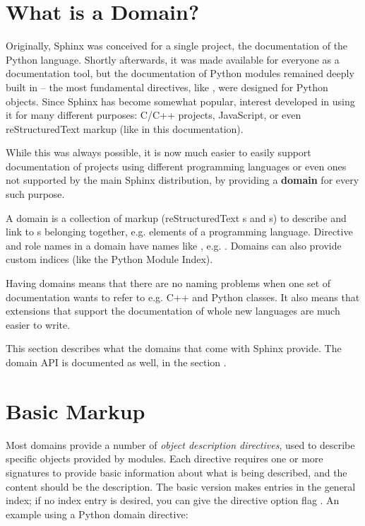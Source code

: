 \documentclass[letterpaper,10pt,english]{sphinxmanual}
\begin{document}
\section{What is a Domain?}
\label{domains:what-is-a-domain}
Originally, Sphinx was conceived for a single project, the documentation of the
Python language.  Shortly afterwards, it was made available for everyone as a
documentation tool, but the documentation of Python modules remained deeply
built in -- the most fundamental directives, like , were designed
for Python objects.  Since Sphinx has become somewhat popular, interest
developed in using it for many different purposes: C/C++ projects, JavaScript,
or even reStructuredText markup (like in this documentation).

While this was always possible, it is now much easier to easily support
documentation of projects using different programming languages or even ones not
supported by the main Sphinx distribution, by providing a \textbf{domain} for every
such purpose.

A domain is a collection of markup (reStructuredText {\hyperref[glossary:term\string-directive]{}}s and
{\hyperref[glossary:term\string-role]{}}s) to describe and link to {\hyperref[glossary:term\string-object]{}}s belonging together,
e.g. elements of a programming language.  Directive and role names in a domain
have names like , e.g. .  Domains can also provide
custom indices (like the Python Module Index).

Having domains means that there are no naming problems when one set of
documentation wants to refer to e.g. C++ and Python classes.  It also means that
extensions that support the documentation of whole new languages are much easier
to write.

This section describes what the domains that come with Sphinx provide.  The
domain API is documented as well, in the section {\hyperref[ext/appapi:domain\string-api]{}}.


\section{Basic Markup}
\label{domains:basic-markup}\label{domains:basic-domain-markup}
Most domains provide a number of \emph{object description directives}, used to
describe specific objects provided by modules.  Each directive requires one or
more signatures to provide basic information about what is being described, and
the content should be the description.  The basic version makes entries in the
general index; if no index entry is desired, you can give the directive option
flag .  An example using a Python domain directive:
\end{document}
